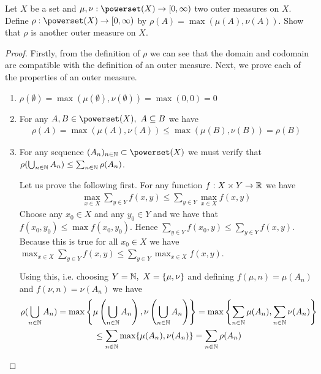 \begin{ex}
	Let $X$ be a set and $\mu, \nu:\powerset(X) \to [0, \infty)$ two outer measures on $X$. Define $\rho: \powerset(X) \to [0, \infty)$ by $\rho(A) = \max(\mu(A), \nu(A))$. Show that $\rho$ is another outer measure on $X$.
\end{ex}

\begin{proof}
	Firstly, from the definition of $\rho$ we can see that the domain and codomain are compatible with the definition of an outer measure. Next, we prove each of the properties of an outer measure.
	\begin{enumerate}
		\item $\rho(\emptyset) = \max(\mu(\emptyset), \nu(\emptyset)) = \max (0, 0) = 0$
		\item For any $A, B \in \powerset(X),\ A \subseteq B$ we have
		\begin{align*}
			\rho(A) =\max(\mu(A), \nu(A)) \leq \max (\mu(B), \nu(B)) = \rho(B)
		\end{align*}
		\item For any sequence $(A_n)_{n\in \N} \subset \powerset(X)$ we must verify that $\rho(\bigcup_{n \in \mathbb{N}} A_n) \leq \sum_{n\in \mathbb{N}} \rho(A_n)$.
		
		Let us prove the following first. For any function $f: X \times Y \to \mathbb{R}$ we have
		\begin{align*}
			\max_{x \in X} \sum_{y \in Y} f(x, y) \leq \sum_{y \in Y} \max_{x \in X} f(x, y)
		\end{align*}
		Choose any $x_0 \in X$ and any $y_0 \in Y$ and we have that $f(x_0, y_0) \leq \max f(x_0, y_0)$. Hence $\sum_{y \in Y} f(x_0, y) \leq \sum_{y \in Y} f(x, y)$. Because this is true for all $x_0 \in X$ we have $\max_{x \in X} \sum_{y \in Y} f(x, y) \leq \sum_{y \in Y} \max_{x \in X} f(x,y)$.
		
		Using this, i.e. choosing $Y = \mathbb{N},\ X = \{\mu, \nu\}$ and defining $f(\mu, n) = \mu(A_n)$ and $f(\nu, n) = \nu(A_n)$ we have
		\begin{multline*}
			\rho(\bigcup_{n \in \mathbb{N}} A_n) = \max\left\{\mu\left(\bigcup_{n \in \mathbb{N}} A_n\right), \nu\left(\bigcup_{n \in \mathbb{N}} A_n\right) \right\} = \max \left\{\sum_{n\in \mathbb{N}} \mu(A_n), \sum_{n\in \mathbb{N}} \nu(A_n) \right\} \\
			\leq \sum_{n\in \mathbb{N}} \max\{\mu(A_n), \nu(A_n)\} = \sum_{n\in \mathbb{N}} \rho(A_n)
		\end{multline*}
	\end{enumerate}
\end{proof}